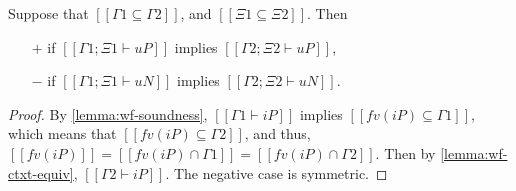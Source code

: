 \begin{corollary}
  \label{lemma:wf-weakening-algo}
  Suppose that $[[{Γ1} ⊆ {Γ2}]]$,
  and $[[Ξ1 ⊆ Ξ2]]$. Then
  \begin{itemize}
    \item[$+$] if $[[Γ1 ; Ξ1 ⊢ uP]]$ implies $[[Γ2 ; Ξ2 ⊢ uP]]$,
    \item [$-$] if $[[Γ1 ; Ξ1 ⊢ uN]]$ implies $[[Γ2 ; Ξ2 ⊢ uN]]$.
  \end{itemize}
\end{corollary}
\begin{proof}
  By \cref{lemma:wf-soundness},
  $[[Γ1 ⊢ iP]]$ implies $[[fv(iP) ⊆ {Γ1}]]$,
  which means that $[[fv(iP) ⊆ {Γ2}]]$,
  and thus, $[[fv(iP)]] = [[fv(iP) ∩ {Γ1}]] = [[fv(iP) ∩ {Γ2}]]$.
  Then by \cref{lemma:wf-ctxt-equiv}, $[[Γ2 ⊢ iP]]$. 
  The negative case is symmetric.
\end{proof}